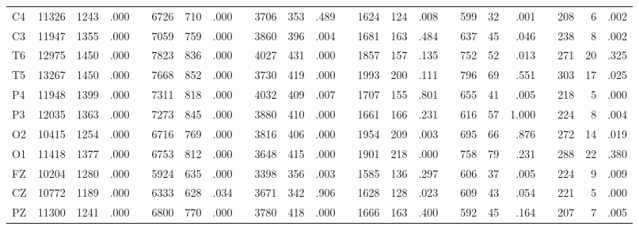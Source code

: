 \begin{SidewaysTable}
{\begin{tabular}{lrrrlrrrlrrrlrrrlrrrlrrr}
C4    & 11326     & 1243    & .000    &  & 6726     & 710     & .000    &  & 3706     & 353    & .489    &  & 1624    & 124    & .008    &  & 599     & 32     & .001   &  & 208     & 6     & .002    \\
C3    & 11947     & 1355    & .000    &  & 7059     & 759     & .000    &  & 3860     & 396    & .004    &  & 1681    & 163    & .484    &  & 637     & 45     & .046   &  & 238     & 8     & .002    \\
T6    & 12975     & 1450    & .000    &  & 7823     & 836     & .000    &  & 4027     & 431    & .000    &  & 1857    & 157    & .135    &  & 752     & 52     & .013   &  & 271     & 20    & .325    \\
T5    & 13267     & 1450    & .000    &  & 7668     & 852     & .000    &  & 3730     & 419    & .000    &  & 1993    & 200    & .111    &  & 796     & 69     & .551   &  & 303     & 17    & .025    \\
P4    & 11948     & 1399    & .000    &  & 7311     & 818     & .000    &  & 4032     & 409    & .007    &  & 1707    & 155    & .801    &  & 655     & 41     & .005   &  & 218     & 5     & .000    \\
P3    & 12035     & 1363    & .000    &  & 7273     & 845     & .000    &  & 3880     & 410    & .000    &  & 1661    & 166    & .231    &  & 616     & 57     & 1.000   &  & 224     & 8     & .004    \\
O2    & 10415     & 1254    & .000    &  & 6716     & 769     & .000    &  & 3816     & 406    & .000    &  & 1954    & 209    & .003    &  & 695     & 66     & .876   &  & 272     & 14    & .019    \\
O1    & 11418     & 1377    & .000    &  & 6753     & 812     & .000    &  & 3648     & 415    & .000    &  & 1901    & 218    & .000    &  & 758     & 79     & .231   &  & 288     & 22    & .380    \\
FZ    & 10204     & 1280    & .000    &  & 5924     & 635     & .000    &  & 3398     & 356    & .003    &  & 1585    & 136    & .297    &  & 606     & 37     & .005   &  & 224     & 9     & .009    \\
CZ    & 10772     & 1189    & .000    &  & 6333     & 628     & .034    &  & 3671     & 342    & .906    &  & 1628    & 128    & .023    &  & 609     & 43     & .054   &  & 221     & 5     & .000    \\
PZ    & 11300     & 1241    & .000    &  & 6800     & 770     & .000    &  & 3780     & 418    & .000    &  & 1666    & 163    & .400    &  & 592     & 45     & .164   &  & 207     & 7     & .005    \\

\end{tabular}}
\end{SidewaysTable}
